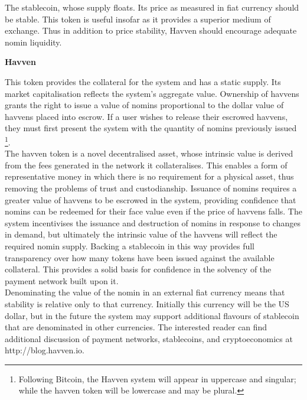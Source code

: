 \noindent The stablecoin, whose supply floats. Its price as measured in fiat currency should be stable. This token is useful insofar as it provides a superior medium of exchange. Thus in addition to price stability, Havven should encourage adequate nomin liquidity.

\vspace{2mm}

\noindent \textbf{Havven}

\vspace{1mm}

\noindent This token provides the collateral for the system and has a static supply. Its market capitalisation reflects the system’s aggregate value. Ownership of havvens grants the right to issue a value of nomins proportional to the dollar value of havvens placed into escrow. If a user wishes to release their escrowed havvens, they must first present the system with the quantity of nomins previously issued \footnote{Following Bitcoin, the Havven system will appear in uppercase and singular; while the havven token will be lowercase and may be plural.}. \\

\noindent The havven token is a novel decentralised asset, whose intrinsic value is derived from the fees generated in the network it collateralises. This enables a form of representative money in which there is no requirement for a physical asset, thus removing the problems of trust and custodianship. Issuance of nomins requires a greater value of havvens to be escrowed in the system, providing confidence that nomins can be redeemed for their face value even if the price of havvens falls. The system incentivises the issuance and destruction of nomins in response to changes in demand, but ultimately the intrinsic value of the havvens will reflect the required nomin supply. Backing a stablecoin in this way provides full transparency over how many tokens have been issued against the available collateral. This provides a solid basis for confidence in the solvency of the payment network built upon it.\\

\noindent Denominating the value of the nomin in an external fiat currency means that stability is relative only to that currency. Initially this currency will be the US dollar, but in the future the system may support additional flavours of stablecoin that are denominated in other currencies. The interested reader can find additional discussion of payment networks, stablecoins, and cryptoeconomics at http://blog.havven.io.

\pagebreak
